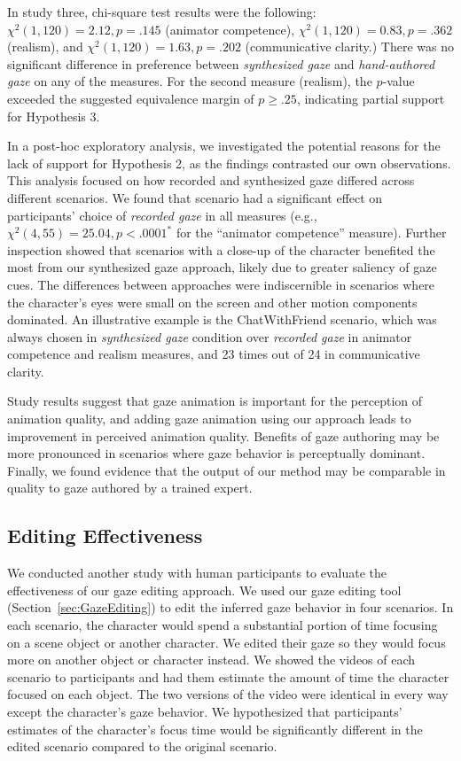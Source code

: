 In study three, chi-square test results were the following: $\chi^2(1, 120) = 2.12, p = .145$ (animator competence), $\chi^2(1, 120) = 0.83, p = .362$ (realism), and $\chi^2(1, 120) = 1.63, p = .202$ (communicative clarity.) There was no significant difference in preference between \emph{synthesized gaze} and \emph{hand-authored gaze} on any of the measures. For the second measure (realism), the $p$-value exceeded the suggested equivalence margin of $p \geq .25$, indicating partial support for Hypothesis 3.

In a post-hoc exploratory analysis, we investigated the potential reasons for the lack of support for Hypothesis 2, as the findings contrasted our own observations. This analysis focused on how recorded and synthesized gaze differed across different scenarios. We found that scenario had a significant effect on participants' choice of \emph{recorded gaze} in all measures (e.g., $\chi^2(4, 55) = 25.04, p < .0001^*$ for the ``animator competence'' measure). Further inspection showed that scenarios with a close-up of the character benefited the most from our synthesized gaze approach, likely due to greater saliency of gaze cues. The differences between approaches were indiscernible in scenarios where the character's eyes were small on the screen and other motion components dominated. An illustrative example is the ChatWithFriend scenario, which was always chosen in \emph{synthesized gaze} condition over \emph{recorded gaze} in animator competence and realism measures, and 23 times out of 24 in communicative clarity.

Study results suggest that gaze animation is important for the perception of animation quality, and adding gaze animation using our approach leads to improvement in perceived animation quality. Benefits of gaze authoring may be more pronounced in scenarios where gaze behavior is perceptually dominant. Finally, we found evidence that the output of our method may be comparable in quality to gaze authored by a trained expert.

\subsection{Editing Effectiveness}
\label{sec:GazeEditingEffectEvaluation}

We conducted another study with human participants to evaluate the effectiveness of our gaze editing approach. We used our gaze editing tool (Section~\ref{sec:GazeEditing}) to edit the inferred gaze behavior in four scenarios. In each scenario, the character would spend a substantial portion of time focusing on a scene object or another character. We edited their gaze so they would focus more on another object or character instead. We showed the videos of each scenario to participants and had them estimate the amount of time the character focused on each object. The two versions of the video were identical in every way except the character's gaze behavior. We hypothesized that participants' estimates of the character's focus time would be significantly different in the edited scenario compared to the original scenario.

